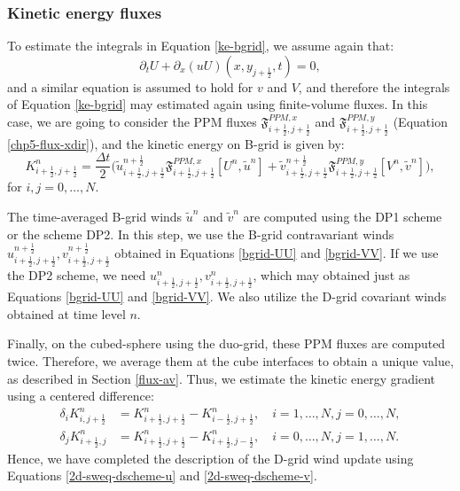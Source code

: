 \subsubsection{Kinetic energy fluxes}
To estimate the integrals in Equation \eqref{ke-bgrid}, we assume again that:
\begin{equation}
	\label{eq_duu}
	{\partial_t U} + {\partial_x (uU)}(x, y_{j+\frac{1}{2}}, t) = 0,
\end{equation}
and a similar equation is assumed to hold for $v$ and $V$, and therefore the integrals 
of Equation \eqref{ke-bgrid} may estimated again using finite-volume fluxes.
In this case, we are going to consider the PPM fluxes
$\mathfrak{F}_{i+\frac{1}{2},j+\frac{1}{2}}^{PPM,x}$ and $\mathfrak{F}_{i+\frac{1}{2},j+\frac{1}{2}}^{PPM,y}$ (Equation \eqref{chp5-flux-xdir}), and
the kinetic energy on B-grid is given by:
\begin{equation}
	\label{ke-flux-bgrid}
	K_{i+\frac{1}{2},j+\frac{1}{2}}^n = \frac{\Delta t}{2}\bigg(
	\tilde{u}_{i+\frac{1}{2},j+\frac{1}{2}}^{n+\frac{1}{2}}\mathfrak{F}_{i+\frac{1}{2},j+\frac{1}{2}}^{PPM,x} [{{U}^n},\tilde{u}^{n}] +
	\tilde{v}_{i+\frac{1}{2},j+\frac{1}{2}}^{n+\frac{1}{2}}\mathfrak{F}_{i+\frac{1}{2},j+\frac{1}{2}}^{PPM,y} [{{V}^n},\tilde{v}^{n}]\bigg),
\end{equation}
for $i,j=0,\ldots,N$.

The time-averaged B-grid winds $\tilde{u}^{n}$ and $\tilde{v}^{n}$ are computed using the DP1 scheme or the scheme DP2.
In this step, we use the B-grid contravariant winds 
${u}_{i+\frac{1}{2},j+\frac{1}{2}}^{n+\frac{1}{2}},{v}_{i+\frac{1}{2},j+\frac{1}{2}}^{n+\frac{1}{2}}$
obtained in Equations \eqref{bgrid-UU} and \eqref{bgrid-VV}.
If we use the DP2 scheme, we need ${u}_{i+\frac{1}{2},j+\frac{1}{2}}^{n},{v}_{i+\frac{1}{2},j+\frac{1}{2}}^{n}$,
which may obtained just as Equations \eqref{bgrid-UU} and \eqref{bgrid-VV}.
We also utilize the D-grid covariant winds obtained at time level $n$. 

Finally, on the cubed-sphere using the duo-grid, these PPM fluxes are computed twice. 
Therefore, we average them at the cube interfaces to obtain a unique value, as described in Section \ref{flux-av}.
Thus, we estimate the kinetic energy gradient using a centered difference:
\begin{align}
	\label{2d-sw-eq-Dgrid-ke-dx}
	\delta_i K^n_{i,j+\frac{1}{2}} &= K_{i+\frac{1}{2},j+\frac{1}{2}}^n - K_{i-\frac{1}{2},j+\frac{1}{2}}^n,
	\quad i=1,\ldots,N, j=0,\ldots,N,\\
	\label{2d-sw-eq-Dgrid-ke-dy}
	\delta_j K^n_{i+\frac{1}{2},j} &= K_{i+\frac{1}{2},j+\frac{1}{2}}^n - K_{i+\frac{1}{2},j-\frac{1}{2}}^n,
	\quad i=0,\ldots,N, j=1,\ldots,N.
\end{align}
Hence, we have completed the description of the D-grid wind update using Equations \eqref{2d-sweq-dscheme-u} and \eqref{2d-sweq-dscheme-v}.

